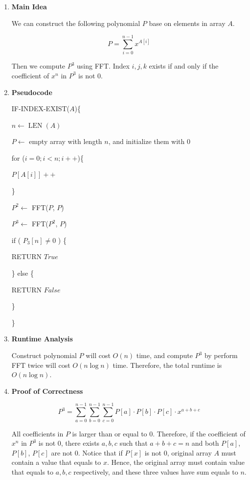 \documentclass[11pt]{article}
\newenvironment{qparts}{\begin{enumerate}[{(}a{)}]}{\end{enumerate}}
\begin{document}
\begin{qparts}
	\item \textbf{Main Idea}
	
	We can construct the following polynomial $P$ base on elements in array $A$.
	
	\[
		P = \sum_{i=0}^{n-1} x^{A[i]}
	\]
	
	Then we compute $P^3$ using FFT. Index $i, j, k$ exists if and only if the coefficient of $x^n$ in $P^3$ is not 0.
	
	\item \textbf{Pseudocode}
	
	IF-INDEX-EXIST($A$)\{
	
		\qquad $n \leftarrow \operatorname{LEN}(A)$
		
		\qquad $P \leftarrow$ empty array with length $n$, and initialize them with 0
		
		\qquad  for ($i=0;i<n;i++$)\{
					
		\qquad\qquad $P[A[i]]++$
				
		\qquad \}
		
		\qquad $P^2 \leftarrow$ FFT($P$, $P$)
		
		\qquad $P^3 \leftarrow$ FFT($P^2$, $P$)
		
		\qquad if ( $P_3[n] \neq 0$ ) \{
		
		\qquad\qquad RETURN $True$
		
		\qquad\} else \{
		
		\qquad\qquad RETURN $False$
		
		\qquad\}
		
	\}
	
	\item \textbf{Runtime Analysis}
	
	Construct polynomial $P$ will cost $O(n)$ time, and compute $P^3$ by perform FFT twice will cost $O(n\log n)$ time. Therefore, the total runtime is $O(n\log n)$.
	
	\item \textbf{Proof of Correctness}
	
	\[
		P^3 = \sum_{a=0}^{n-1} \sum_{b=0}^{n-1} \sum_{c=0}^{n-1} P[a] \cdot P[b] \cdot P[c] \cdot x^{a+b+c}
	\]
	
	All coefficients in $P$ is larger than or equal to 0. Therefore, if the coefficient of $x^n$ in $P^3$ is not 0, there exists $a, b, c$ such that $a + b + c = n$ and both $P[a]$, $P[b]$, $P[c]$ are not 0. Notice that if $P[x]$ is not 0, original array $A$ must contain a value that equals to $x$. Hence, the original array must contain value that equals to $a, b, c$ respectively, and these three values have sum equals to $n$.
	
\end{qparts}
\end{document}
